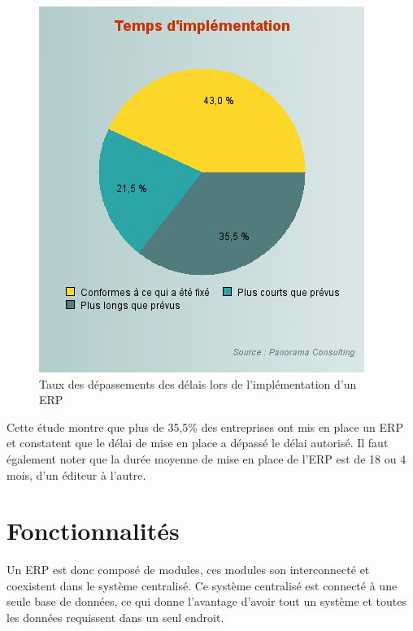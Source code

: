\begin{figure}[H]
    \centering
    \includegraphics[scale=0.65]{ERP/graph-taux-implementation.png}
    \caption{Taux des dépassements des délais lors de l’implémentation d’un ERP}
\end{figure} 

Cette étude montre que plus de 35,5\% des entreprises ont mis en place un \acs{ERP} et constatent que le délai de mise en place a dépassé le délai autorisé. Il faut également noter que la durée moyenne de mise en place de l'\acs{ERP} est de 18 ou 4 mois, d'un éditeur à l'autre.\\

\section{Fonctionnalités}
Un \acs{ERP} est donc composé de modules\cite{modules}, ces modules son interconnecté et coexistent dans le système centralisé. Ce système centralisé est connecté à une seule base de données, ce qui donne l'avantage d'avoir tout un système et toutes les données requissent dans un seul endroit.\\

